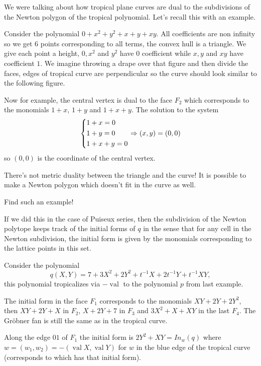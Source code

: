 \documentclass[12pt]{memoir}
\DeclareMathOperator{\val}{val}
\begin{document}
We were talking about how tropical plane curves are dual to the subdivisions of the Newton polygon of the tropical polynomial. Let's recall this with an example. 

\begin{Ex}
    Consider the polynomial $0+x^2+y^2+x+y+xy$. All coefficients are non infinity so we get 6 points corresponding to all terms, the convex hull is a triangle. We give each point a height, $0,x^2$ and $y^2$ have $0$ coefficient while $x,y$ and $xy$ have coefficient $1$. We imagine throwing a drape over that figure and then divide the faces, edges of tropical curve are perpendicular so the curve should look similar to the following figure.\par
    \par 
    Now for example, the central vertex is dual to the face $F_2$ which corresponds to the monomials $1+x$, $1+y$ and $1+x+y$. The solution to the system 
    $$
    \left\lbrace
    \begin{aligned}
        &1+x=0\\
        &1+y=0\\
        &1+x+y=0\\
    \end{aligned}
    \right.
    \Rightarrow (x,y)=(0,0)
    $$
    so $(0,0)$ is the coordinate of the central vertex.
\end{Ex}

\begin{Rmk}
There's not metric duality between the triangle and the curve! It is possible to make a Newton polygon which doesn't fit in the curve as well.
\end{Rmk}

\begin{Ej}[5]
Find such an example!
\end{Ej}

If we did this in the case of Puiseux series, then the subdivision of the Newton polytope keeps track of the initial forms of $q$ in the sense that for any cell in the Newton subdivision, the initial form is given by the monomials corresponding to the lattice points in this set.

\begin{Ex}
    Consider the polynomial 
    $$q(X,Y)=7+3X^2+2Y^2+t^{-1}X+2t^{-1}Y+t^{-1}XY,$$
    this polynomial tropicalizes via $-\val$ to the polynomial $p$ from last example.\par {}\par 
    The initial form in the face $F_1$ corresponds to the monomials $XY+2Y+2Y^2$, then $XY+2Y+X$ in $F_2$, $X+2Y+7$ in $F_3$ and $3X^2+X+XY$ in the last $F_4$. The Gr\"obner fan is still the same as in the tropical curve.\par 
    Along the edge $01$ of $F_1$ the initial form is $2Y^2+XY=In_w(q)$ where $w=(w_1,w_2)=-(\val X,\val Y)$ for $w$ in the blue edge of the tropical curve (corresponds to  which has that initial form). 
\end{Ex}
\end{document}
